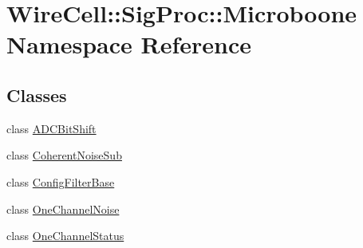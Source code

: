 \hypertarget{namespace_wire_cell_1_1_sig_proc_1_1_microboone}{}\section{Wire\+Cell\+:\+:Sig\+Proc\+:\+:Microboone Namespace Reference}
\label{namespace_wire_cell_1_1_sig_proc_1_1_microboone}
\subsection*{Classes}
\begin{DoxyCompactItemize}
\item 
class \hyperlink{class_wire_cell_1_1_sig_proc_1_1_microboone_1_1_a_d_c_bit_shift}{A\+D\+C\+Bit\+Shift}
\item 
class \hyperlink{class_wire_cell_1_1_sig_proc_1_1_microboone_1_1_coherent_noise_sub}{Coherent\+Noise\+Sub}
\item 
class \hyperlink{class_wire_cell_1_1_sig_proc_1_1_microboone_1_1_config_filter_base}{Config\+Filter\+Base}
\item 
class \hyperlink{class_wire_cell_1_1_sig_proc_1_1_microboone_1_1_one_channel_noise}{One\+Channel\+Noise}
\item 
class \hyperlink{class_wire_cell_1_1_sig_proc_1_1_microboone_1_1_one_channel_status}{One\+Channel\+Status}
\end{DoxyCompactItemize}
